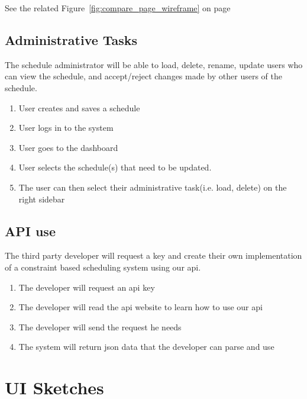 \documentclass{extarticle}
\begin{document}
\begin{appendices}
See the related Figure~\ref{fig:compare_page_wireframe} on page~\pageref{fig:compare_page_wireframe}

\subsection{Administrative Tasks}
The schedule administrator will be able to load, delete, rename, update users who can view the schedule, and accept/reject
changes made by other users of the schedule.
\begin{enumerate}
    \item User creates and saves a schedule
    \item User logs in to the system
    \item User goes to the dashboard
    \item User selects the schedule(s) that need to be updated.
    \item The user can then select their administrative task(i.e. load, delete) on the right sidebar
\end{enumerate}


\subsection{API use}
The third party developer will request a key and create their own implementation of a constraint based scheduling
system using our api.

\begin{enumerate}
    \item The developer will request an api key
    \item The developer will read the api website to learn how to use our api
    \item The developer will send the request he needs
    \item The system will return json data that the developer can parse and use
\end{enumerate}

\clearpage

\section{UI Sketches}


\end{appendices}
\end{document}
